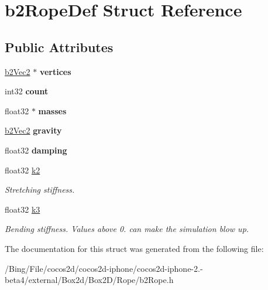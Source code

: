 \hypertarget{structb2_rope_def}{\section{b2\-Rope\-Def Struct Reference}
\label{structb2_rope_def}
}
\subsection*{Public Attributes}
\begin{DoxyCompactItemize}
\item 
\hypertarget{structb2_rope_def_ae18ad98b9796c505ae62ce58fa2f7051}{\hyperlink{structb2_vec2}{b2\-Vec2} $\ast$ {\bfseries vertices}}\label{structb2_rope_def_ae18ad98b9796c505ae62ce58fa2f7051}

\item 
\hypertarget{structb2_rope_def_a0c75d4289a807e31f32dc43a2276671f}{int32 {\bfseries count}}\label{structb2_rope_def_a0c75d4289a807e31f32dc43a2276671f}

\item 
\hypertarget{structb2_rope_def_a78f75cce30ee253062ffa6f5462b36a1}{float32 $\ast$ {\bfseries masses}}\label{structb2_rope_def_a78f75cce30ee253062ffa6f5462b36a1}

\item 
\hypertarget{structb2_rope_def_a90d98969150047662ce835ec1670fb32}{\hyperlink{structb2_vec2}{b2\-Vec2} {\bfseries gravity}}\label{structb2_rope_def_a90d98969150047662ce835ec1670fb32}

\item 
\hypertarget{structb2_rope_def_a13ad872bb9d4926f3e4e49b7061613cb}{float32 {\bfseries damping}}\label{structb2_rope_def_a13ad872bb9d4926f3e4e49b7061613cb}

\item 
\hypertarget{structb2_rope_def_a89de5d2c15afacd41722c76523e33826}{float32 \hyperlink{structb2_rope_def_a89de5d2c15afacd41722c76523e33826}{k2}}\label{structb2_rope_def_a89de5d2c15afacd41722c76523e33826}

\begin{DoxyCompactList}\small\item\em Stretching stiffness. \end{DoxyCompactList}\item 
\hypertarget{structb2_rope_def_a3f4749e0a309b53daf804c75adfb4ba8}{float32 \hyperlink{structb2_rope_def_a3f4749e0a309b53daf804c75adfb4ba8}{k3}}\label{structb2_rope_def_a3f4749e0a309b53daf804c75adfb4ba8}

\begin{DoxyCompactList}\small\item\em Bending stiffness. Values above 0. can make the simulation blow up. \end{DoxyCompactList}\end{DoxyCompactItemize}


The documentation for this struct was generated from the following file\-:\begin{DoxyCompactItemize}
\item 
/\-Bing/\-File/cocos2d/cocos2d-\/iphone/cocos2d-\/iphone-\/2.-\/beta4/external/\-Box2d/\-Box2\-D/\-Rope/b2\-Rope.\-h\end{DoxyCompactItemize}

